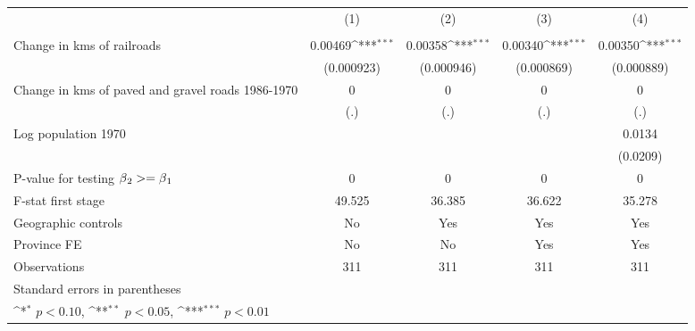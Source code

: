 {
\def\sym#1{\ifmmode^{#1}\else\(^{#1}\)\fi}
\begin{tabular}{l*{4}{c}}
\hline\hline
                &\multicolumn{1}{c}{(1)}&\multicolumn{1}{c}{(2)}&\multicolumn{1}{c}{(3)}&\multicolumn{1}{c}{(4)}\\
                &\multicolumn{1}{c}{}&\multicolumn{1}{c}{}&\multicolumn{1}{c}{}&\multicolumn{1}{c}{}\\
\hline
Change in kms of railroads&  0.00469\sym{***}&  0.00358\sym{***}&  0.00340\sym{***}&  0.00350\sym{***}\\
                &(0.000923)         &(0.000946)         &(0.000869)         &(0.000889)         \\
[1em]
Change in kms of paved and gravel roads 1986-1970&        0         &        0         &        0         &        0         \\
                &      (.)         &      (.)         &      (.)         &      (.)         \\
[1em]
Log population 1970&                  &                  &                  &   0.0134         \\
                &                  &                  &                  & (0.0209)         \\
\hline
P-value for testing $\beta\\_2 >= \beta\\_1$&        0         &        0         &        0         &        0         \\
F-stat first stage&   49.525         &   36.385         &   36.622         &   35.278         \\
Geographic controls&       No         &      Yes         &      Yes         &      Yes         \\
Province FE     &       No         &       No         &      Yes         &      Yes         \\
Observations    &      311         &      311         &      311         &      311         \\
\hline\hline
\multicolumn{5}{l}{\footnotesize Standard errors in parentheses}\\
\multicolumn{5}{l}{\footnotesize \sym{*} \(p<0.10\), \sym{**} \(p<0.05\), \sym{***} \(p<0.01\)}\\
\end{tabular}
}
